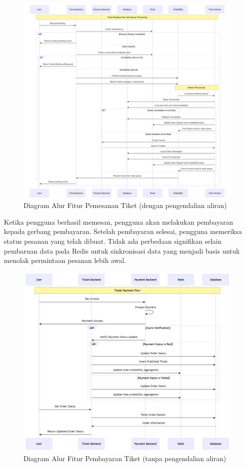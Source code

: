 \begin{figure}[h]
    \centering
    \includegraphics[width=1\textwidth]{resources/chapter-3/book-async.png}
    \caption{Diagram Alur Fitur Pemesanan Tiket (dengan pengendalian aliran)}
    \label{fig:flow-book-fc}
\end{figure}

\pagebreak

Ketika pengguna berhasil memesan, pengguna akan melakukan pembayaran kepada gerbang pembayaran. Setelah pembayaran selesai, pengguna memeriksa status pesanan yang telah dibuat. Tidak ada perbedaan signifikan selain pembaruan data pada Redis untuk sinkronisasi data yang menjadi basis untuk menolak permintaan pesanan lebih awal.

\begin{figure}[h]
    \centering
    \includegraphics[width=1\textwidth]{resources/chapter-3/order-payment.png}
    \caption{Diagram Alur Fitur Pembayaran Tiket (tanpa pengendalian aliran)}
    \label{fig:flow-order-payment-fc}
\end{figure}

